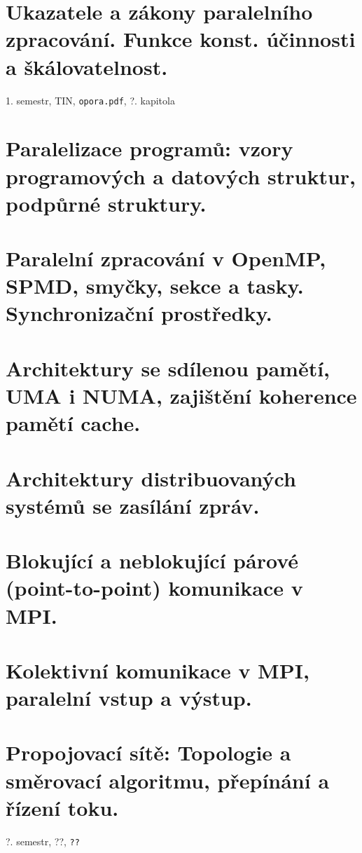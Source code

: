 \documentclass[a4paper, 11pt]{report}
\begin{document}
\chapter{Ukazatele a zákony paralelního zpracování. Funkce konst. účinnosti a škálovatelnost.} \label{cha:26}
1. semestr, TIN, \texttt{opora.pdf}, ?. kapitola

\chapter{Paralelizace programů: vzory programových a datových struktur, podpůrné struktury.} \label{cha:27}
\chapter{Paralelní zpracování v OpenMP, SPMD, smyčky, sekce a tasky. Synchronizační prostředky.} \label{cha:28}
\chapter{Architektury se sdílenou pamětí, UMA i NUMA, zajištění koherence pamětí cache.} \label{cha:29}
\chapter{Architektury distribuovaných systémů se zasílání zpráv.} \label{cha:30}
\chapter{Blokující a neblokující párové (point-to-point) komunikace v MPI.} \label{cha:31}
\chapter{Kolektivní komunikace v MPI, paralelní vstup a výstup.} \label{cha:32}
\chapter{Propojovací sítě: Topologie a směrovací algoritmu, přepínání a řízení toku.} \label{cha:33}
?. semestr, ??, \texttt{??}

\end{document}
